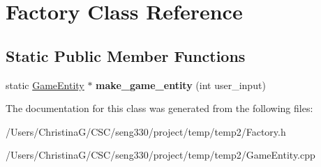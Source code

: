 \hypertarget{class_factory}{}\section{Factory Class Reference}
\label{class_factory}
\subsection*{Static Public Member Functions}
\begin{DoxyCompactItemize}
\item 
\hypertarget{class_factory_a96c2bf28ba98e5072521ea43be8efd02}{}static \hyperlink{class_game_entity}{Game\+Entity} $\ast$ {\bfseries make\+\_\+game\+\_\+entity} (int user\+\_\+input)\label{class_factory_a96c2bf28ba98e5072521ea43be8efd02}

\end{DoxyCompactItemize}


The documentation for this class was generated from the following files\+:\begin{DoxyCompactItemize}
\item 
/\+Users/\+Christina\+G/\+C\+S\+C/seng330/project/temp/temp2/Factory.\+h\item 
/\+Users/\+Christina\+G/\+C\+S\+C/seng330/project/temp/temp2/Game\+Entity.\+cpp\end{DoxyCompactItemize}

